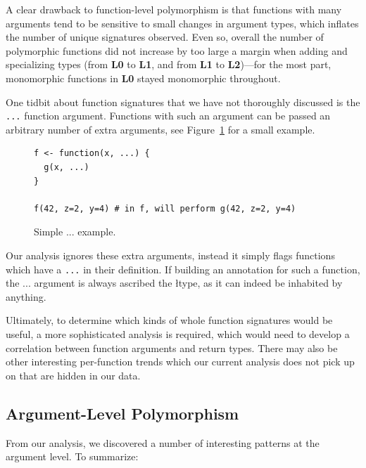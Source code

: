 \documentclass[acmsmall,10pt,review,anonymous]{acmart}\settopmatter{printfolios=true,printccs=false,printacmref=false}
\begin{document}
A clear drawback to function-level polymorphism is that functions with many arguments tend to be sensitive to small changes in argument types, which inflates the number of unique signatures observed.
Even so, overall the number of polymorphic functions did not increase by too large a margin when adding and specializing types (from {\bf L0} to {\bf L1}, and from {\bf L1} to {\bf L2})---for the most part, monomorphic functions in {\bf L0} stayed monomorphic throughout.

One tidbit about function signatures that we have not thoroughly discussed is the {\tt ...} function argument.
Functions with such an argument can be passed an arbitrary number of extra arguments, see Figure~\ref{fig:dotdotdot} for a small example.

\begin{figure}[!hb]{\small\begin{lstlisting}[style=R]
f <- function(x, ...) {
  g(x, ...)
}

f(42, z=2, y=4) # in f, will perform g(42, z=2, y=4)

\end{lstlisting}}\caption{Simple ... example.}\label{fig:dotdotdot}\end{figure}

Our analysis ignores these extra arguments, instead it simply flags functions which have a {\tt ...} in their definition.
If building an annotation for such a function, the ... argument is always ascribed the \l type, as it can indeed be inhabited by anything.

Ultimately, to determine which kinds of whole function signatures would be useful, a more sophisticated analysis is required, which would need to develop a correlation between function arguments and return types.
There may also be other interesting per-function trends which our current analysis does not pick up on that are hidden in our data.

%
%
%
%
\subsection{Argument-Level Polymorphism}

From our analysis, we discovered a number of interesting patterns at the argument level.
To summarize:
\end{document}
